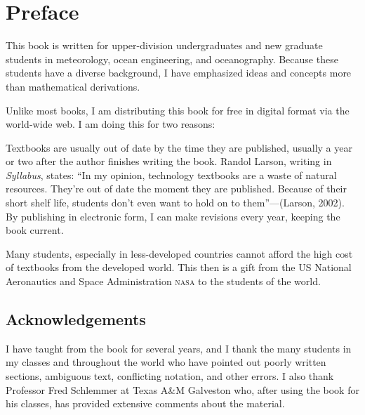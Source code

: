 
\tableofcontents

\chapter{Preface}
This book is written for upper-division undergraduates and new
graduate students in meteorology, ocean engineering, and
oceanography. Because these students have a diverse background, I have
emphasized ideas and concepts more than mathematical derivations.

Unlike most books, I am distributing this book for free in digital
format via the world-wide web. I am doing this for two reasons:
\begin{enumerate}
\vitem Textbooks are usually out of date by the time they are
published, usually a year or two after the author finishes writing the
book. Randol Larson, writing in \textit{Syllabus}, states: ``In my
opinion, technology textbooks are a waste of natural
resources. They're out of date the moment they are published. Because
of their short shelf life, students don't even want to hold on to
them''---(Larson, 2002). By publishing in electronic form, I can make
revisions every year, keeping the book current.

\vitem Many students, especially in less-developed countries cannot
afford the high cost of textbooks from the developed world. This then
is a gift from the US National Aeronautics and Space Administration
\textsc{nasa} to the students of the world.
\end{enumerate} 

\section*{Acknowledgements}
I have taught from the book for several years, and I thank the many
students in my classes and throughout the world who have pointed out
poorly written sections, ambiguous text, conflicting notation, and
other errors.  I also thank Professor Fred Schlemmer at Texas A\&M
Galveston who, after using the book for his classes, has provided
extensive comments about the material.

